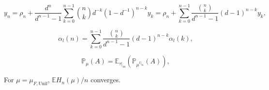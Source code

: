 \documentclass[10pt,a4paper]{amsart}
\newcommand{\EE}{\mathbb{E}}
\newcommand{\PP}{\mathbb{P}}
\newcommand{\Unif}{\mathrm{Unif}}
\begin{document}
    \begin{equation}\label{eq:rearranged}
    y_n = \rho_n + \frac{d^n}{d^{n-1}-1}\sum_{k=0}^{n-1}\binom{n}{k}d^{-k}(1-d^{-1})^{n-k} y_k=\rho_n + \sum_{k=0}^{n-1}\frac{\binom{n}{k}}{d^{n-1}-1}(d-1)^{n-k}y_k,
    \end{equation}

    \begin{equation}\label{eq:recursion_alpha}
        \alpha_l(n)=\sum_{k=0}^{n-1}\frac{\binom{n}{k}}{d^{n-1}-1}(d-1)^{n-k}\alpha_l(k),
    \end{equation}

\begin{equation} \label{eq:disintegration}
\PP_{\mu}(A)=\EE_{\tau|_m}(\PP_{\mu^{t|_m}}(A)),
\end{equation}

\begin{lemma}\label{lemma:random_aut_conv_means}
    For $\mu=\mu_{F,\Unif}$, $\EE H_n(\mu)/n$ converges.
\end{lemma}
\end{document}

